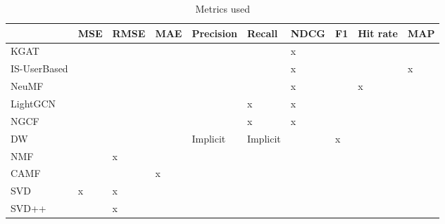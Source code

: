 \begin{table*}[]
    \centering
    \begin{tabular}{|l|l|l|l|l|l|l|l|l|l|}
    \hline
             & \textbf{MSE} & \textbf{RMSE} & \textbf{MAE} & \textbf{Precision} & \textbf{Recall} & \textbf{NDCG} & \textbf{F1} & \textbf{Hit rate} & \textbf{MAP} \\ \hline
KGAT         &              &               &              &                    &                 & x             &             &                   &              \\ \hline
IS-UserBased &              &               &              &                    &                 & x             &             &                   & x            \\ \hline
NeuMF        &              &               &              &                    &                 & x             &             & x                 &              \\ \hline
LightGCN     &              &               &              &                    & x               & x             &             &                   &              \\ \hline
NGCF         &              &               &              &                    & x               & x             &             &                   &              \\ \hline
DW           &              &               &              & Implicit                & Implicit             &               & x           &                   &              \\ \hline
NMF          &              & x             &              &                    &                 &               &             &                   &              \\ \hline
CAMF         &              &               & x            &                    &                 &               &             &                   &              \\ \hline
SVD          & x            & x             &              &                    &                 &               &             &                   &              \\ \hline
SVD++        &              & x             &              &                    &                 &               &             &                   &              \\ \hline
    \end{tabular}
    \caption{Metrics used}
    \label{tab:metricsused}
\end{table*}

